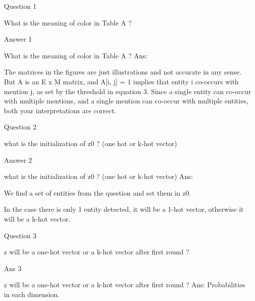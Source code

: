 \documentclass[10pt]{beamer}
\begin{document}
\begin{frame}{Question 1}

    \begin{exampleblock}{What is the meaning of color in Table A ?}
    \end{exampleblock}

\end{frame}

\begin{frame}{Answer 1}

    \begin{exampleblock}{What is the meaning of color in Table A ?}
        Ans: 
        
        The matrices in the figures are just illustrations and not accurate in any sense. But A is an E x M matrix, and A[i, j] = 1 implies that entity i co-occurs with mention j, as set by the threshold in equation 3. Since a single entity can co-occur with multiple mentions, and a single mention can co-occur with multiple entities, both your interpretations are correct.
    \end{exampleblock}

\end{frame}

\begin{frame}{Question 2}

    \begin{exampleblock}{what is the initialization of z0 ? (one hot or k-hot vector)}
    \end{exampleblock}

\end{frame}

\begin{frame}{Answer 2}

    \begin{exampleblock}{what is the initialization of z0 ? (one hot or k-hot vector)}
        Ans: 

        We find a set of entities from the question and set them in z0. 
        
        In the case there is only 1 entity detected, it will be a 1-hot vector, otherwise it will be a k-hot vector.
    \end{exampleblock}

\end{frame}

\begin{frame}{Question 3}
    \begin{exampleblock}{z will be a one-hot vector or a k-hot vector after first round ?}
        
    \end{exampleblock}

\end{frame}


\begin{frame}{Ans 3}
    \begin{exampleblock}{z will be a one-hot vector or a k-hot vector after first round ?}
        Ans: Probabilities in each dimension.
    \end{exampleblock}

\end{frame}
\end{document}
